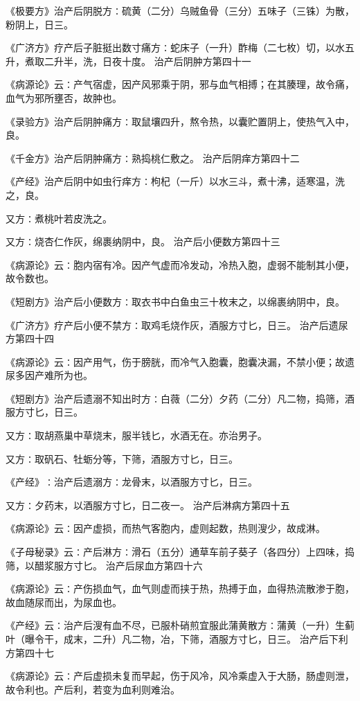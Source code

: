 \documentclass[a4paper,12pt,UTF8,twoside]{ctexbook}
\begin{document}
《极要方》治产后阴脱方∶硫黄（二分）乌贼鱼骨（三分）五味子（三铢）为散，粉阴上，日三。

《广济方》疗产后子脏挺出数寸痛方∶蛇床子（一升）酢梅（二七枚）切，以水五升，煮取二升半，洗，日夜十度。
治产后阴肿方第四十一

《病源论》云∶产气宿虚，因产风邪乘于阴，邪与血气相搏；在其腠理，故令痛，血气为邪所壅否，故肿也。

《录验方》治产后阴肿痛方∶取鼠壤四升，熬令热，以囊贮置阴上，使热气入中，良。

《千金方》治产后阴肿痛方∶熟捣桃仁敷之。
治产后阴痒方第四十二

《产经》治产后阴中如虫行痒方∶枸杞（一斤）以水三斗，煮十沸，适寒温，洗之，良。

又方∶煮桃叶若皮洗之。

又方∶烧杏仁作灰，绵裹纳阴中，良。
治产后小便数方第四十三

《病源论》云∶胞内宿有冷。因产气虚而冷发动，冷热入胞，虚弱不能制其小便，故令数也。

《短剧方》治产后小便数方∶取衣书中白鱼虫三十枚末之，以绵裹纳阴中，良。

《广济方》疗产后小便不禁方∶取鸡毛烧作灰，酒服方寸匕，日三。
治产后遗尿方第四十四

《病源论》云∶因产用气，伤于膀胱，而冷气入胞囊，胞囊决漏，不禁小便；故遗尿多因产难所为也。

《短剧方》治产后遗溺不知出时方∶白薇（二分）夕药（二分）凡二物，捣筛，酒服方寸匕，日三。

又方∶取胡燕巢中草烧末，服半钱匕，水酒无在。亦治男子。

又方∶取矾石、牡蛎分等，下筛，酒服方寸匕，日三。

《产经》∶治产后遗溺方∶龙骨末，以酒服方寸匕，日三。

又方∶夕药末，以酒服方寸匕，日二夜一。
治产后淋病方第四十五

《病源论》云∶因产虚损，而热气客胞内，虚则起数，热则溲少，故成淋。

《子母秘录》云∶产后淋方∶滑石（五分）通草车前子葵子（各四分）上四味，捣筛，以醋浆服方寸匕。
治产后尿血方第四十六

《病源论》云∶产伤损血气，血气则虚而挟于热，热搏于血，血得热流散渗于胞，故血随尿而出，为尿血也。

《产经》云∶治产后溲有血不尽，已服朴硝煎宜服此蒲黄散方∶蒲黄（一升）生蓟叶（曝令干，成末，二升）凡二物，冶，下筛，酒服方寸匕，日三。
治产后下利方第四十七

《病源论》云∶产后虚损未复而早起，伤于风冷，风冷乘虚入于大肠，肠虚则泄，故令利也。产后利，若变为血利则难治。
\end{document}
